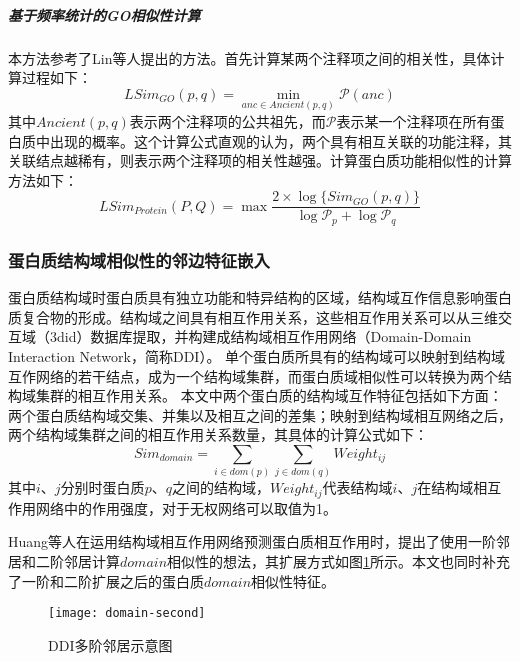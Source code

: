 \subparagraph*{基于频率统计的GO相似性计算}

本方法参考了Lin等人\cite{lin_information-theoretic_1998}提出的方法。首先计算某两个注释项之间的相关性，具体计算过程如下：
\begin{equation}
    \label{equ:feat:go:SimItemLin}
    LSim_{GO}(p,q)=\min_{anc \in Ancient(p,q)}\mathcal{P} (anc)
\end{equation}
其中$Ancient(p,q)$表示两个注释项的公共祖先，而$\mathcal{P}$表示某一个注释项在所有蛋白质中出现的概率。这个计算公式直观的认为，两个具有相互关联的功能注释，其关联结点越稀有，则表示两个注释项的相关性越强。计算蛋白质功能相似性的计算方法如下：
\begin{equation}
    \label{equ:feat:go:SimProteinLin}
    LSim_{Protein}(P,Q)=\max{\frac{2\times \log \{Sim_{GO}(p,q)\}}{\log {\mathcal{P}_p}+\log {\mathcal{P}_q}} }
\end{equation}

\subsubsection{蛋白质结构域相似性的邻边特征嵌入}

蛋白质结构域时蛋白质具有独立功能和特异结构的区域，结构域互作信息影响蛋白质复合物的形成\cite{kim_relating_2006}。结构域之间具有相互作用关系，这些相互作用关系可以从三维交互域（3did）数据库\cite{mosca_3did_2014}提取，并构建成结构域相互作用网络（Domain-Domain Interaction Network，简称DDI）。
单个蛋白质所具有的结构域可以映射到结构域互作网络的若干结点，成为一个结构域集群，而蛋白质域相似性可以转换为两个结构域集群的相互作用关系。
本文中两个蛋白质的结构域互作特征包括如下方面：两个蛋白质结构域交集、并集以及相互之间的差集；映射到结构域相互网络之后，两个结构域集群之间的相互作用关系数量，其具体的计算公式如下：
\begin{equation}
    \label{equ:feat:domain}
    Sim_{domain} = \sum_{i \in dom(p)}{\sum_{j \in dom(q)}{Weight_{ij}}}
\end{equation}
其中$i$、$j$分别时蛋白质$p$、$q$之间的结构域，$Weight_{ij}$代表结构域$i$、$j$在结构域相互作用网络中的作用强度，对于无权网络可以取值为1。

Huang等人\cite{huang_protein-protein_2013}在运用结构域相互作用网络预测蛋白质相互作用时，提出了使用一阶邻居和二阶邻居计算$domain$相似性的想法，其扩展方式如图\ref{fig:domain-second}所示。本文也同时补充了一阶和二阶扩展之后的蛋白质$domain$相似性特征。
\begin{figure}[htbp]
    \centering
    \texttt{[image: domain-second]}
    \caption{DDI多阶邻居示意图}
    \label{fig:domain-second}
\end{figure}

